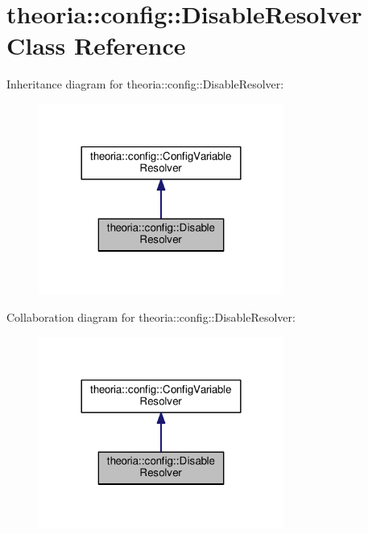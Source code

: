 \hypertarget{classtheoria_1_1config_1_1DisableResolver}{\section{theoria\+:\+:config\+:\+:Disable\+Resolver Class Reference}
\label{classtheoria_1_1config_1_1DisableResolver}
}


Inheritance diagram for theoria\+:\+:config\+:\+:Disable\+Resolver\+:
\nopagebreak
\begin{figure}[H]
\begin{center}
\leavevmode
\includegraphics[width=228pt]{classtheoria_1_1config_1_1DisableResolver__inherit__graph}
\end{center}
\end{figure}


Collaboration diagram for theoria\+:\+:config\+:\+:Disable\+Resolver\+:
\nopagebreak
\begin{figure}[H]
\begin{center}
\leavevmode
\includegraphics[width=228pt]{classtheoria_1_1config_1_1DisableResolver__coll__graph}
\end{center}
\end{figure}
